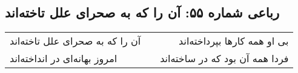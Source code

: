 \begin{center}
\section*{رباعی شماره ۵۵: آن را که به صحرای علل تاخته‌اند}
\label{sec:sh055}
\begin{longtable}{l p{0.5cm} r}
آن را که به صحرای علل تاخته‌اند
&&
بی او همه کارها بپرداخته‌اند
\\
امروز بهانه‌ای در انداخته‌اند
&&
فردا همه آن بود که در ساخته‌اند
\\
\end{longtable}
\end{center}

